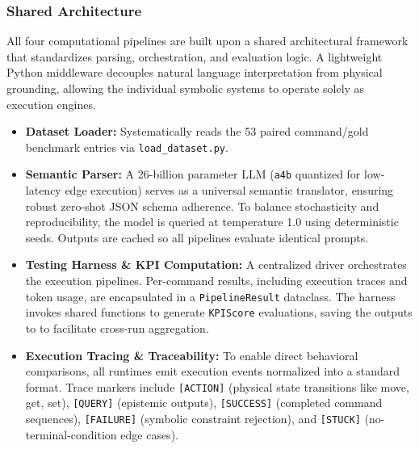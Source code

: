 \documentclass[a4paper]{article}
\begin{document}
\subsubsection{Shared Architecture}
All four computational pipelines are built upon a shared architectural framework that standardizes parsing, orchestration, and evaluation logic. A lightweight Python middleware decouples natural language interpretation from physical grounding, allowing the individual symbolic systems to operate solely as execution engines.

\begin{itemize}
    \item \textbf{Dataset Loader:} Systematically reads the 53 paired command/gold benchmark entries via \texttt{load\_dataset.py}.
    \item \textbf{Semantic Parser:} A 26-billion parameter LLM (\texttt{a4b} quantized for low-latency edge execution) serves as a universal semantic translator, ensuring robust zero-shot JSON schema adherence. To balance stochasticity and reproducibility, the model is queried at temperature 1.0 using deterministic seeds. Outputs are cached so all pipelines evaluate identical prompts.
    \item \textbf{Testing Harness \& KPI Computation:} A centralized driver orchestrates the execution pipelines. Per-command results, including execution traces and token usage, are encapsulated in a \texttt{PipelineResult} dataclass. The harness invokes shared functions to generate \texttt{KPIScore} evaluations, saving the outputs to  to facilitate cross-run aggregation.
    \item \textbf{Execution Tracing \& Traceability:} To enable direct behavioral comparisons, all runtimes emit execution events normalized into a standard format. Trace markers include \texttt{[ACTION]} (physical state transitions like move, get, set), \texttt{[QUERY]} (epistemic outputs), \texttt{[SUCCESS]} (completed command sequences), \texttt{[FAILURE]} (symbolic constraint rejection), and \texttt{[STUCK]} (no-terminal-condition edge cases).
\end{itemize}
\end{document}
